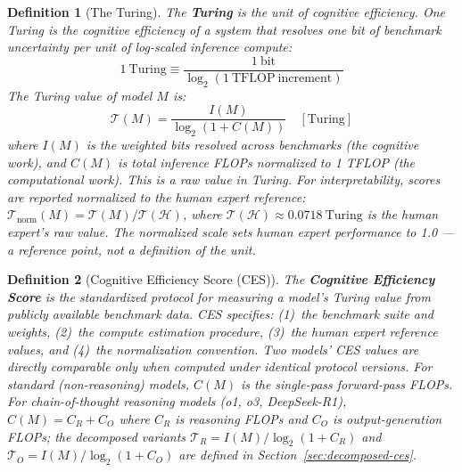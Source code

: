 \documentclass[12pt]{article}
\newtheorem{definition}{Definition}
\begin{document}
\begin{definition}[The Turing]
The \textbf{Turing} is the unit of cognitive efficiency. One Turing is the cognitive efficiency of a system that resolves one bit of benchmark uncertainty per unit of log-scaled inference compute:
\begin{equation}
1\ \mathrm{Turing} \equiv \frac{1\ \mathrm{bit}}{\log_2(1\ \mathrm{TFLOP}\ \text{increment})}
\end{equation}
The Turing value of model $M$ is:
\begin{equation}
\boxed{\mathcal{T}(M) = \frac{I(M)}{\log_2(1 + C(M))} \quad [\mathrm{Turing}]}
\end{equation}
where $I(M)$ is the weighted bits resolved across benchmarks (the cognitive work), and $C(M)$ is total inference FLOPs normalized to 1 TFLOP (the computational work). This is a raw value in Turing. For interpretability, scores are reported normalized to the human expert reference: $\mathcal{T}_{\mathrm{norm}}(M) = \mathcal{T}(M) / \mathcal{T}(\mathcal{H})$, where $\mathcal{T}(\mathcal{H}) \approx 0.0718\ \mathrm{Turing}$ is the human expert's raw value. The normalized scale sets human expert performance to 1.0 --- a reference point, not a definition of the unit.
\end{definition}

\begin{definition}[Cognitive Efficiency Score (CES)]
The \textbf{Cognitive Efficiency Score} is the standardized protocol for measuring a model's Turing value from publicly available benchmark data. CES specifies: (1)~the benchmark suite and weights, (2)~the compute estimation procedure, (3)~the human expert reference values, and (4)~the normalization convention. Two models' CES values are directly comparable only when computed under identical protocol versions. For standard (non-reasoning) models, $C(M)$ is the single-pass forward-pass FLOPs. For chain-of-thought reasoning models (o1, o3, DeepSeek-R1), $C(M) = C_R + C_O$ where $C_R$ is reasoning FLOPs and $C_O$ is output-generation FLOPs; the decomposed variants $\mathcal{T}_R = I(M)/\log_2(1+C_R)$ and $\mathcal{T}_O = I(M)/\log_2(1+C_O)$ are defined in Section~\ref{sec:decomposed-ces}.
\end{definition}
\end{document}
